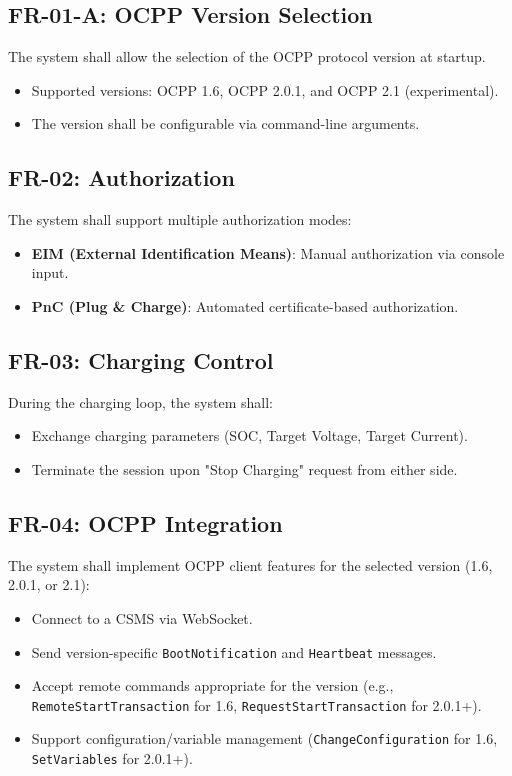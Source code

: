 \documentclass[a4paper,11pt]{report}
\begin{document}
\subsection{FR-01-A: OCPP Version Selection}
The system shall allow the selection of the OCPP protocol version at startup.
\begin{itemize}
    \item Supported versions: OCPP 1.6, OCPP 2.0.1, and OCPP 2.1 (experimental).
    \item The version shall be configurable via command-line arguments.
\end{itemize}

\subsection{FR-02: Authorization}
The system shall support multiple authorization modes:
\begin{itemize}
    \item \textbf{EIM (External Identification Means)}: Manual authorization via console input.
    \item \textbf{PnC (Plug \& Charge)}: Automated certificate-based authorization.
\end{itemize}

\subsection{FR-03: Charging Control}
During the charging loop, the system shall:
\begin{itemize}
    \item Exchange charging parameters (SOC, Target Voltage, Target Current).
    \item Terminate the session upon "Stop Charging" request from either side.
\end{itemize}

\subsection{FR-04: OCPP Integration}
The system shall implement OCPP client features for the selected version (1.6, 2.0.1, or 2.1):
\begin{itemize}
    \item Connect to a CSMS via WebSocket.
    \item Send version-specific \texttt{BootNotification} and \texttt{Heartbeat} messages.
    \item Accept remote commands appropriate for the version (e.g., \texttt{RemoteStartTransaction} for 1.6, \texttt{RequestStartTransaction} for 2.0.1+).
    \item Support configuration/variable management (\texttt{ChangeConfiguration} for 1.6, \texttt{SetVariables} for 2.0.1+).
\end{itemize}
\end{document}
